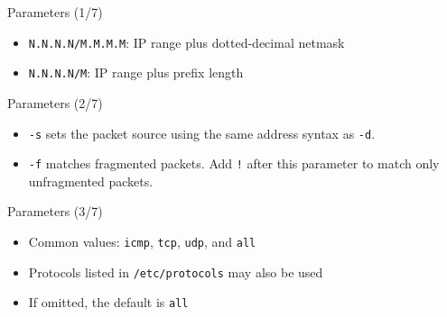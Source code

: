 \begin{frame}[t]{Parameters (1/7)}
\vspace{0.2cm}
\begin{itemize}
  \item \texttt{N.N.N.N/M.M.M.M}: IP range plus dotted-decimal netmask
  \item \texttt{N.N.N.N/M}: IP range plus prefix length
\end{itemize}
\end{frame}

\begin{frame}[t]{Parameters (2/7)}
\begin{itemize}
  \item \textcolor{CommandGreen}{\texttt{-s}} sets the packet source using the same address syntax as \texttt{-d}.
  \item \textcolor{CommandGreen}{\texttt{-f}} matches fragmented packets. Add \texttt{!} after this parameter to match only unfragmented packets.
\end{itemize}
\end{frame}

\begin{frame}[t]{Parameters (3/7)}
\begin{itemize}
  \item Common values: \texttt{icmp}, \texttt{tcp}, \texttt{udp}, and \texttt{all}
  \item Protocols listed in \texttt{/etc/protocols} may also be used
  \item If omitted, the default is \texttt{all}
\end{itemize}
\end{frame}

